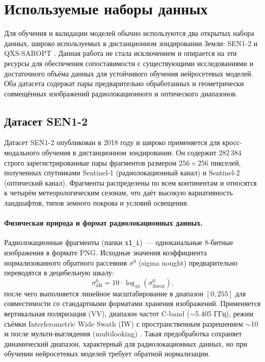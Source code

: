 \section{Используемые наборы данных}
\label{sec:datasets}

Для обучения и валидации моделей обычно используются два открытых набора данных, широко используемых в дистанционном зондировании Земли: SEN1-2 \cite{schmitt2018sen1} и QXS-SAROPT \cite{huang2021qxs}.
Данная работа не стала исключением и опирается на эти ресурсы для обеспечения сопоставимости с существующими исследованиями и достаточного объёма данных для устойчивого обучения нейросетевых моделей.
Оба датасета содержат пары предварительно обработанных и геометрически совмещённых изображений радиолокационного и оптического диапазонов.

\subsection{Датасет SEN1-2}
\label{subsec:sen1-2}

Датасет SEN1-2 \cite{schmitt2018sen1} опубликован в 2018 году и широко применяется для кросс-модального обучения в дистанционном зондировании.
Он содержит 282\,384 строго зарегистрированные пары фрагментов размером $256 \times 256$ пикселей, полученных спутниками Sentinel-1 (радиолокационный канал) и Sentinel-2 (оптический канал).
Фрагменты распределены по всем континентам и относятся к четырём метеорологическим сезонам, что даёт высокую вариативность ландшафтов, типов земного покрова и условий освещения.

\paragraph{Физическая природа и формат радиолокационных данных.}
Радиолокационные фрагменты (папки \texttt{s1\_i})~--- одноканальные 8-битные изображения в формате PNG.
Исходные значения коэффициента нормализованного обратного рассеяния $\sigma^0$ (sigma nought) предварительно переводятся в децибельную шкалу:
\begin{equation}
    \sigma^0_{\text{dB}} = 10 \cdot \log_{10}(\sigma^0_{\text{linear}}),
\end{equation}
после чего выполняется линейное масштабирование в диапазон $[0, 255]$ для совместимости со стандартными форматами хранения изображений.
Применяется вертикальная поляризация (VV), диапазон частот C-band ($\sim$5.405 ГГц), режим съёмки Interferometric Wide Swath (IW) с пространственным разрешением $\sim$10 м после мульти-выглядения (multilooking) \cite{schmitt2018sen1}.
Такая предобработка сохраняет динамический диапазон, характерный для радиолокационных данных, но при обучении нейросетевых моделей требует обратной нормализации.

